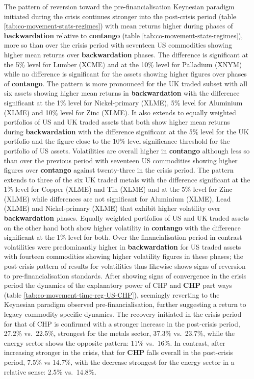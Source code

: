 \documentclass[]{elsarticle} %
\begin{document}
The pattern of reversion toward the pre-financialisation Keynesian paradigm initiated during the crisis continues stronger into the post-crisis period (table \ref{tab:co-movement-stats-regimes}) with mean returns higher during phases of \textbf{backwardation} relative to \textbf{contango} (table \ref{tab:co-movement-stats-regimes}), more so than over the crisis period with seventeen US commodities showing higher mean returns over \textbf{backwardation} phases. The difference is significant at the 5\% level for Lumber (XCME) and at the 10\% level for Palladium (XNYM) while no difference is significant for the assets showing higher figures over phases of \textbf{contango}. The pattern is more pronounced for the UK traded subset with all six assets showing higher mean returns in \textbf{backwardation} with the difference significant at the 1\% level for Nickel-primary (XLME), 5\% level for Aluminium (XLME) and 10\% level for Zinc (XLME). It also extends to equally weighted portfolios of US and UK traded assets that both show higher mean returns during \textbf{backwardation} with the difference significant at the 5\% level for the UK portfolio and the figure close to the 10\% level significance threshold for the portfolio of US assets. Volatilities are overall higher in \textbf{contango} although less so than over the previous period with seventeen US commodities showing higher figures over \textbf{contango} against twenty-three in the crisis period. The pattern extends to three of the six UK traded metals with the difference significant at the 1\% level for Copper (XLME) and Tin (XLME) and at the 5\% level for Zinc (XLME) while differences are not significant for Aluminium (XLME), Lead (XLME) and Nickel-primary (XLME) that exhibit higher volatility over \textbf{backwardation} phases. Equally weighted portfolios of US and UK traded assets on the other hand both show higher volatility in \textbf{contango} with the difference significant at the 1\% level for both. Over the financialisation period in contrast volatilities were predominantly higher in \textbf{backwardation} for US traded assets with fourteen commodities showing higher volatility figures in these phases; the post-crisis pattern of results for volatilities thus likewise shows signs of reversion to pre-financialisation standards. After showing signs of convergence in the crisis period the dynamics of the explanatory power of CHP and \textbf{CHP} part ways (table \ref{tab:co-movement-time-reg-US-CHP}), seemingly reverting to the Keynesian paradigm observed pre-financialisation, further suggesting a return to legacy commodity specific dynamics. The recovery initiated in the crisis period for that of CHP is confirmed with a stronger increase in the post-crisis period, 27.2\% vs.~22.5\%, strongest for the metals sector, 37.3\% vs.~23.7\%, while the energy sector shows the opposite pattern: 11\% vs.~16\%. In contrast, after increasing stronger in the crisis, that for \textbf{CHP} falls overall in the post-crisis period, 7.5\% vs 14.7\%, with the decrease strongest for the energy sector in a relative sense: 2.5\% vs.~14.8\%.\\
\end{document}
